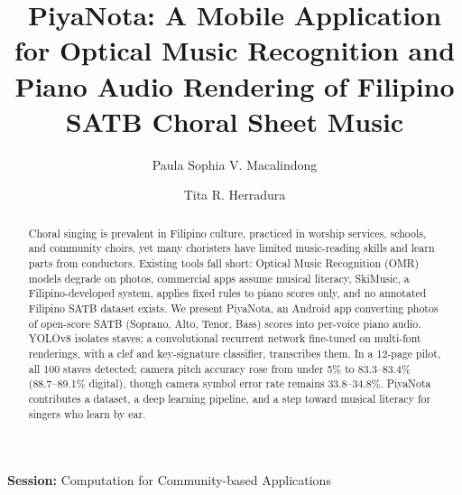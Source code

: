 \documentclass{svproc}
\begin{document}
\mainmatter              %
\pagestyle{empty}        %
%
\title{PiyaNota: A Mobile Application for Optical Music Recognition and
Piano Audio Rendering of Filipino SATB Choral Sheet Music}
%
%
\author{Paula Sophia V. Macalindong \and Tita R. Herradura}
%
%
%

\maketitle
\thispagestyle{empty}

\begin{abstract}
Choral singing is prevalent in Filipino culture, practiced in worship
services, schools, and community choirs, yet many choristers have
limited music-reading skills and learn parts from conductors. Existing
tools fall short: Optical Music Recognition (OMR) models degrade on
photos, commercial apps assume musical literacy, SkiMusic, a
Filipino-developed system, applies fixed rules to piano scores only, and
no annotated Filipino SATB dataset exists. We present PiyaNota, an
Android app converting photos of open-score SATB (Soprano, Alto, Tenor,
Bass) scores into per-voice piano audio. YOLOv8 isolates staves; a
convolutional recurrent network fine-tuned on multi-font renderings, with
a clef and key-signature classifier, transcribes them. In a 12-page
pilot, all 100 staves detected; camera pitch accuracy rose from under
5\% to 83.3--83.4\% (88.7--89.1\% digital), though camera symbol error rate
remains 33.8--34.8\%. PiyaNota contributes a dataset, a deep learning
pipeline, and a step toward musical literacy for singers who learn by
ear.
\end{abstract}

\noindent\textbf{Session:} Computation for Community-based Applications
\end{document}
